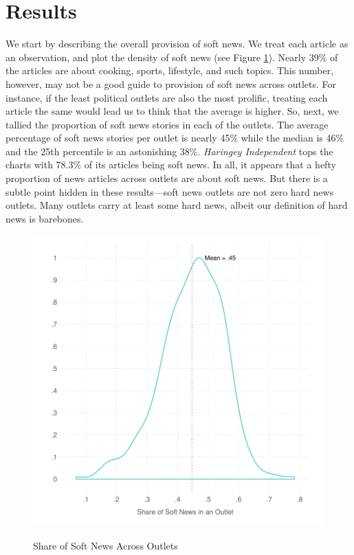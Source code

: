 \documentclass[12pt, letterpaper]{article}
\begin{document}
\section*{Results}
We start by describing the overall provision of soft news. We treat each article as an observation, and plot the density of soft news (see Figure \ref{fig:agg_density}).  Nearly 39\% of the articles are about cooking, sports, lifestyle, and such topics. This number, however, may not be a good guide to provision of soft news across outlets. For instance, if the least political outlets are also the most prolific, treating each article the same would lead us to think that the average is higher. So, next, we tallied the proportion of soft news stories in each of the outlets. The average percentage of soft news stories per outlet is nearly 45\% while the median is 46\% and the 25th percentile is an astonishing 38\%. \textit{Haringey Independent} tops the charts with 78.3\% of its articles being soft news. In all, it appears that a hefty proportion of news articles across outlets are about soft news. But there is a subtle point hidden in these results---soft news outlets are not zero hard news outlets. Many outlets carry at least some hard news, albeit our definition of hard news is barebones.

\begin{figure}[!htbp]
\centering
\caption{Share of Soft News Across Outlets}
\includegraphics[scale=.9]{../figs/uk_not_news_by_outlet.pdf}
\label{fig:agg_density}
\end{figure}
\end{document}
